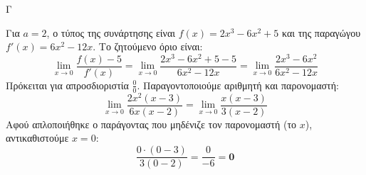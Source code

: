 \begin{thema}{Γ}
\begin{erwthma}
\item Για $a=2$, ο τύπος της συνάρτησης είναι $f(x) = 2x^3 - 6x^2 + 5$ και της παραγώγου $f'(x) = 6x^2 - 12x$.
Το ζητούμενο όριο είναι:
\[ \lim_{x \to 0} \frac{f(x) - 5}{f'(x)} = \lim_{x \to 0} \frac{2x^3 - 6x^2 + 5 - 5}{6x^2 - 12x} = \lim_{x \to 0} \frac{2x^3 - 6x^2}{6x^2 - 12x} \]
Πρόκειται για απροσδιοριστία $\frac{0}{0}$. Παραγοντοποιούμε αριθμητή και παρονομαστή:
\[ \lim_{x \to 0} \frac{2x^2(x - 3)}{6x(x - 2)} = \lim_{x \to 0} \frac{x(x - 3)}{3(x - 2)} \]
Αφού απλοποιήθηκε ο παράγοντας που μηδένιζε τον παρονομαστή (το $x$), αντικαθιστούμε $x = 0$:
\[ \frac{0 \cdot (0 - 3)}{3(0 - 2)} = \frac{0}{-6} = \boldsymbol{0} \]
\end{erwthma}
\end{thema}

